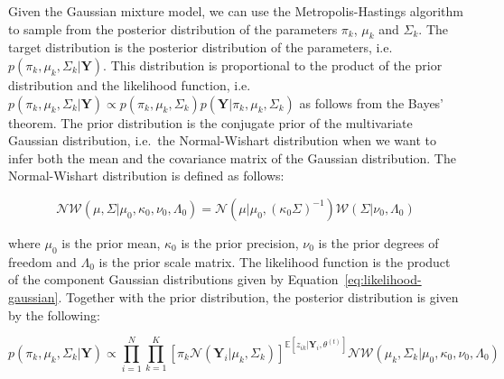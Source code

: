 Given the Gaussian mixture model, we can use the Metropolis-Hastings algorithm to sample from the posterior distribution of the parameters $\pi_k$, $\mu_k$ and $\Sigma_k$. 
The target distribution is the posterior distribution of the parameters, i.e. $p(\pi_k,\mu_k,\Sigma_k|\textbf{Y})$.
This distribution is proportional to the product of the prior distribution and the likelihood function, i.e. $p(\pi_k,\mu_k,\Sigma_k|\textbf{Y}) \propto p(\pi_k,\mu_k,\Sigma_k)p(\textbf{Y}|\pi_k,\mu_k,\Sigma_k)$ as follows from the Bayes' theorem.
The prior distribution is the conjugate prior of the multivariate Gaussian distribution, i.e.\ the Normal-Wishart distribution when we want to infer both the mean and the covariance matrix of the Gaussian distribution.
The Normal-Wishart distribution is defined as follows:

\begin{equation}
    \mathcal{NW}(\mu,\Sigma|\mu_0,\kappa_0,\nu_0,\Lambda_0) = \mathcal{N}(\mu|\mu_0,{(\kappa_0\Sigma)}^{-1})\mathcal{W}(\Sigma|\nu_0,\Lambda_0)
\end{equation}

where $\mu_0$ is the prior mean, $\kappa_0$ is the prior precision, $\nu_0$ is the prior degrees of freedom and $\Lambda_0$ is the prior scale matrix.
The likelihood function is the product of the component Gaussian distributions given by Equation~\ref{eq:likelihood-gaussian}. Together with the prior distribution, the posterior distribution is given by the following:

\begin{equation}
    p(\pi_k,\mu_k,\Sigma_k|\textbf{Y}) \propto \prod_{i=1}^{N} \prod_{k=1}^{K} {\left[ \pi_k \mathcal{N}(\textbf{Y}_i|\mu_k,\Sigma_k) \right]}^{\mathbb{E}[z_{ik}|\textbf{Y}_i,\theta^{(t)}]} \mathcal{NW}(\mu_k,\Sigma_k|\mu_0,\kappa_0,\nu_0,\Lambda_0)
\end{equation}

